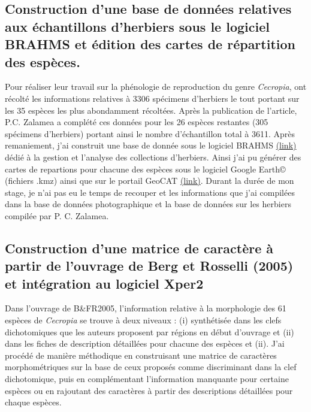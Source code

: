 \documentclass[a4paper]{article}
\theoremstyle{definition}
\theoremstyle{definition}
\theoremstyle{definition}
\theoremstyle{remark}
\begin{document}
\subsection{Construction d'une base de données relatives aux
échantillons d'herbiers sous le logiciel BRAHMS et édition des cartes de
répartition des
espèces.}\label{construction-dune-base-de-donnees-relatives-aux-echantillons-dherbiers-sous-le-logiciel-brahms-et-edition-des-cartes-de-repartition-des-especes.}

Pour réaliser leur travail sur la phénologie de reproduction du genre
\emph{Cecropia}, \citet{Zalamea2011} ont récolté les informations
relatives à 3306 spécimens d'herbiers le tout portant sur les 35 espèces
les plus abondamment récoltées. Après la publication de l'article, P.C.
Zalamea a complété ces données pour les 26 espèces restantes (305
spécimens d'herbiers) portant ainsi le nombre d'échantillon total à
3611. Après remaniement, j'ai construit une base de donnée sous le
logiciel BRAHMS \href{http://herbaria.plants.ox.ac.uk/bol/}{(link)}
dédié à la gestion et l'analyse des collections d'herbiers. Ainsi j'ai
pu générer des cartes de repartions pour chacune des espèces sous le
logiciel Google Earth© (fichiers .kmz) ainsi que sur le portail GeoCAT
\href{http://geocat.kew.org/}{(link)}. Durant la durée de mon stage, je
n'ai pas eu le temps de recouper et les informations que j'ai compilées
dans la base de données photographique et la base de données sur les
herbiers compilée par P. C. Zalamea.

\subsection{Construction d'une matrice de caractère à partir de
l'ouvrage de Berg et Rosselli (2005) et intégration au logiciel
Xper2}\label{construction-dune-matrice-de-caractere-a-partir-de-louvrage-de-berg-et-rosselli-2005-et-integration-au-logiciel-xper2}

Dans l'ouvrage de B\&FR2005, l'information relative à la morphologie des
61 espèces de \emph{Cecropia} se trouve à deux niveaux : (i) synthétisée
dans les clefs dichotomiques que les auteurs proposent par régions en
début d'ouvrage et (ii) dans les fiches de description détaillées pour
chacune des espèces et (ii). J'ai procédé de manière méthodique en
construisant une matrice de caractères morphométriques sur la base de
ceux proposés comme discriminant dans la clef dichotomique, puis en
complémentant l'information manquante pour certaine espèces ou en
rajoutant des caractères à partir des descriptions détaillées pour
chaque espèces.
\end{document}
